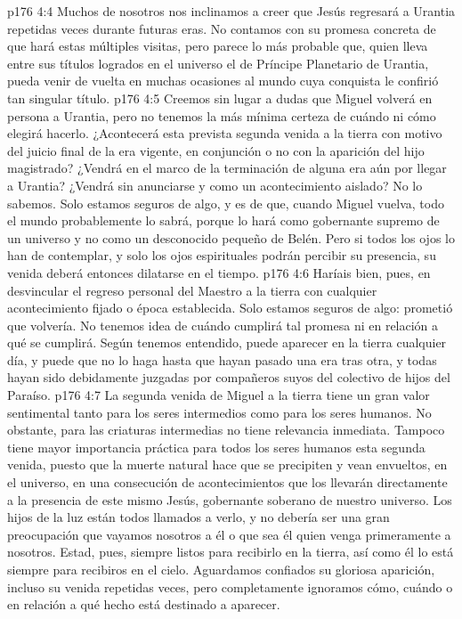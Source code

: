 \vs p176 4:4 Muchos de nosotros nos inclinamos a creer que Jesús regresará a Urantia repetidas veces durante futuras eras. No contamos con su promesa concreta de que hará estas múltiples visitas, pero parece lo más probable que, quien lleva entre sus títulos logrados en el universo el de Príncipe Planetario de Urantia, pueda venir de vuelta en muchas ocasiones al mundo cuya conquista le confirió tan singular título.
\vs p176 4:5 Creemos sin lugar a dudas que Miguel volverá en persona a Urantia, pero no tenemos la más mínima certeza de cuándo ni cómo elegirá hacerlo. ¿Acontecerá esta prevista segunda venida a la tierra con motivo del juicio final de la era vigente, en conjunción o no con la aparición del hijo magistrado? ¿Vendrá en el marco de la terminación de alguna era aún por llegar a Urantia? ¿Vendrá sin anunciarse y como un acontecimiento aislado? No lo sabemos. Solo estamos seguros de algo, y es de que, cuando Miguel vuelva, todo el mundo probablemente lo sabrá, porque lo hará como gobernante supremo de un universo y no como un desconocido pequeño de Belén. Pero si todos los ojos lo han de contemplar, y solo los ojos espirituales podrán percibir su presencia, su venida deberá entonces dilatarse en el tiempo.
\vs p176 4:6 Haríais bien, pues, en desvincular el regreso personal del Maestro a la tierra con cualquier acontecimiento fijado o época establecida. Solo estamos seguros de algo: prometió que volvería. No tenemos idea de cuándo cumplirá tal promesa ni en relación a qué se cumplirá. Según tenemos entendido, puede aparecer en la tierra cualquier día, y puede que no lo haga hasta que hayan pasado una era tras otra, y todas hayan sido debidamente juzgadas por compañeros suyos del colectivo de hijos del Paraíso.
\vs p176 4:7 La segunda venida de Miguel a la tierra tiene un gran valor sentimental tanto para los seres intermedios como para los seres humanos. No obstante, para las criaturas intermedias no tiene relevancia inmediata. Tampoco tiene mayor importancia práctica para todos los seres humanos esta segunda venida, puesto que la muerte natural hace que se precipiten y vean envueltos, en el universo, en una consecución de acontecimientos que los llevarán directamente a la presencia de este mismo Jesús, gobernante soberano de nuestro universo. Los hijos de la luz están todos llamados a verlo, y no debería ser una gran preocupación que vayamos nosotros a él o que sea él quien venga primeramente a nosotros. Estad, pues, siempre listos para recibirlo en la tierra, así como él lo está siempre para recibiros en el cielo. Aguardamos confiados su gloriosa aparición, incluso su venida repetidas veces, pero completamente ignoramos cómo, cuándo o en relación a qué hecho está destinado a aparecer.
